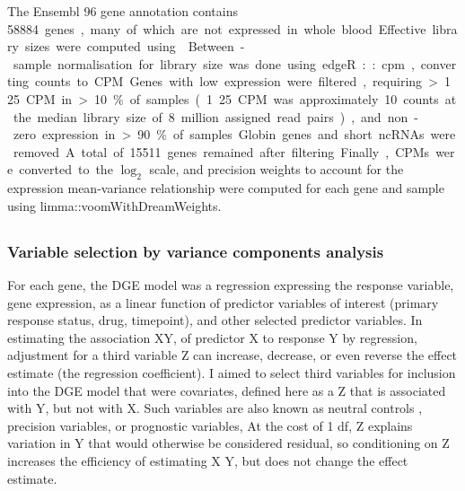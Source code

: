 The Ensembl 96 gene annotation contains \SI{58884} genes, many of which are not expressed in whole blood.
Effective library sizes were computed using .
Between-sample normalisation for library size was done using edgeR::cpm, converting counts to \gls{CPM}.
Genes with low expression were filtered,
requiring >1.25 CPM in >10\% of samples (1.25 CPM was approximately 10 counts at the median library size of 8 million assigned read pairs),
and non-zero expression in >90\% of samples.
Globin genes and short ncRNAs were removed.
A total of 15511 genes remained after filtering.
Finally, \glspl{CPM} were converted to the $\log_{2}$ scale, and precision weights to account for the expression mean-variance relationship were computed for each gene and sample using limma::voomWithDreamWeights.

\subsection{}

\subsubsection{Variable selection by variance components analysis}
\label{subsubsec:multiPANTS_var_selection}

For each gene, the \gls{DGE} model was a regression expressing the response variable, gene expression, 
as a linear function of predictor variables of interest (primary response status, drug, timepoint),
and other selected predictor variables.
In estimating the association X\textrightarrow Y, of predictor X to response Y by regression, 
adjustment for a third variable Z can increase, decrease, or even reverse the effect estimate (the regression coefficient).
I aimed to select third variables for inclusion into the \gls{DGE} model that were covariates,
defined here as a Z that is associated with Y, but not with X.
Such variables are also known as neutral controls \autocite{cinelli2020CrashCourseGood}, precision variables, or prognostic variables,
At the cost of 1 \gls{df},
Z explains variation in Y that would otherwise be considered residual,
so conditioning on Z increases the efficiency of estimating X \textrightarrow Y, but does not change the effect estimate.

